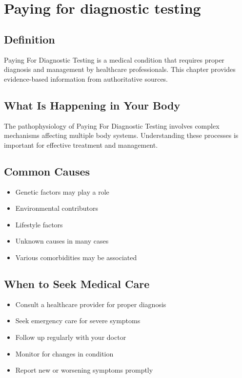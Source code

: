 
\chapter{Paying for diagnostic testing}

\section*{Definition}
Paying For Diagnostic Testing is a medical condition that requires proper diagnosis and management by healthcare professionals. This chapter provides evidence-based information from authoritative sources.

\section*{What Is Happening in Your Body}
The pathophysiology of Paying For Diagnostic Testing involves complex mechanisms affecting multiple body systems. Understanding these processes is important for effective treatment and management.

\section*{Common Causes}
\begin{itemize}
  \item Genetic factors may play a role
  \item Environmental contributors
  \item Lifestyle factors
  \item Unknown causes in many cases
  \item Various comorbidities may be associated
\end{itemize}

\section*{When to Seek Medical Care}
\begin{itemize}
  \item Consult a healthcare provider for proper diagnosis
  \item Seek emergency care for severe symptoms
  \item Follow up regularly with your doctor
  \item Monitor for changes in condition
  \item Report new or worsening symptoms promptly
\end{itemize}

